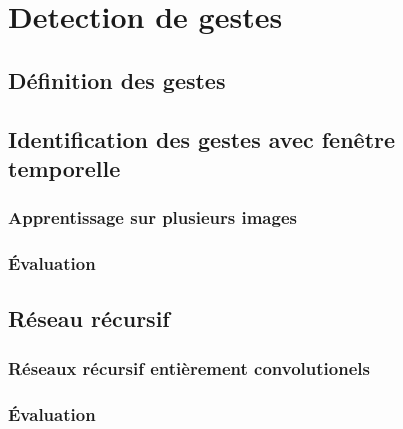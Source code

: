 \chapter{Detection de gestes}
\label{chap:gestes}
\section{Définition des gestes}


\section{Identification des gestes avec fenêtre temporelle}

\subsection{Apprentissage sur plusieurs images}

\subsection{Évaluation}



\section{Réseau récursif}

\subsection{Réseaux récursif entièrement convolutionels}


\subsection{Évaluation}
